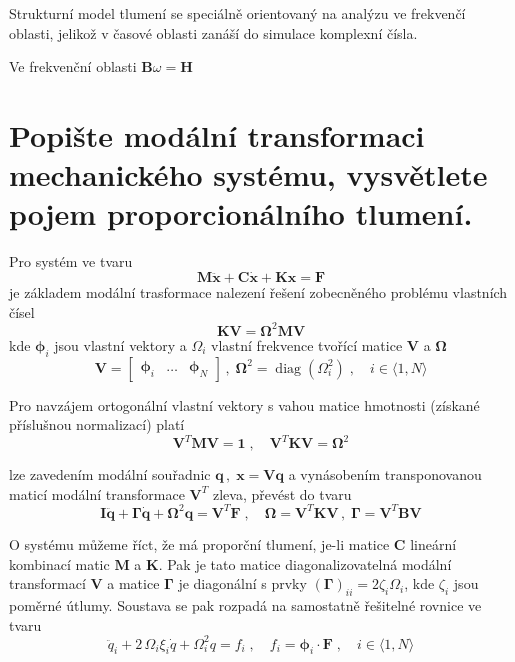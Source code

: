 \documentclass{article}
\begin{document}
	Strukturní model tlumení se speciálně orientovaný na analýzu ve frekvenčí oblasti, jelikož v časové oblasti zanáší do simulace komplexní čísla.

	Ve frekvenční oblasti $\bm{B}\omega = \bm{H}$

	\section{Popište modální transformaci mechanického systému, vysvětlete pojem proporcionálního tlumení. }

	Pro systém ve tvaru
	\begin{equation*}
		\bm{M}\bm{\ddot{x}} + \bm{C}\bm{\dot{x}} + \bm{K}\bm{x} = \bm{F}
	\end{equation*}
	je základem modální trasformace nalezení řešení zobecněného problému vlastních čísel
	\begin{equation*}
		\bm{K}\bm{V} = \bm{\Omega}^2 \bm{M} \bm{V}
	\end{equation*}
	kde $\bm{\phi}_i$ jsou vlastní vektory a $\Omega_i$ vlastní frekvence tvořící matice $\bm{V}$ a $\bm{\Omega}$  
	\begin{equation*}
		\bm{V} = \begin{bmatrix} \bm{\phi}_i & \dots & \bm{\phi}_N \end{bmatrix}
		\,,\;
		\bm{\Omega}^2 = \operatorname{diag}(\Omega_i^2)
		\;,\quad 
		i \in \langle 1,N \rangle
	\end{equation*}

	Pro navzájem ortogonální vlastní vektory s vahou matice hmotnosti (získané příslušnou normalizací) platí
	\begin{equation*}
		\bm{V}^T\bm{M}\bm{V} = \bm{1}
		\;,\quad 
		\bm{V}^T\bm{K}\bm{V} = \bm{\Omega}^2
	\end{equation*}
	
	lze zavedením modální souřadnic $\bm{q} \,,\; \bm{x} = \bm{V}\bm{q}$ a vynásobením transponovanou maticí modální transformace $\bm{V}^T$ zleva, převést do tvaru
	\begin{equation*}
		\bm{I}\bm{\ddot{q}} + \bm{\Gamma}\bm{\dot{q}} + \bm{\Omega}^2 \bm{q} = \bm{V}^T \bm{F}
		\;,\quad 
		\bm{\Omega} = \bm{V}^T\bm{K}\bm{V}
		\,,\;
		\bm{\Gamma} = \bm{V}^T\bm{B}\bm{V}
	\end{equation*}

	O systému můžeme říct, že má proporční tlumení, je-li matice $\bm{C}$ lineární kombinací matic $\bm{M}$ a $\bm{K}$. Pak je tato matice diagonalizovatelná modální transformací $\bm{V}$ a matice $\bm{\Gamma}$ je diagonální s prvky $(\bm{\Gamma})_{ii} = 2 \zeta_{i} \Omega_i$, kde $\zeta_i$ jsou poměrné útlumy. Soustava se pak rozpadá na samostatně řešitelné rovnice ve tvaru
	\begin{equation*}
		\ddot{q}_i + 2\,\Omega_i\xi_i \dot{q} + \Omega_i^2 q = f_i
		\;,\quad 
		f_i = \bm{\phi}_i \cdot \bm{F}
		\;,\quad 
		i \in \langle 1,N \rangle
	\end{equation*}
\end{document}
